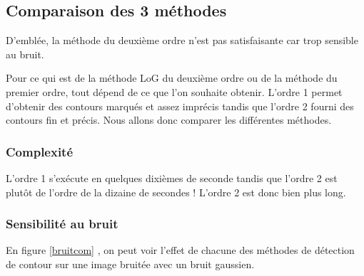 \documentclass[paper=a4, fontsize=11pt]{scrartcl} %
\begin{document}
\subsection{Comparaison des 3 méthodes}
D'emblée, la méthode du deuxième ordre n'est pas satisfaisante car trop sensible au bruit.

Pour ce qui est de la méthode LoG du deuxième ordre ou de la méthode du premier ordre, tout dépend de ce que l'on souhaite obtenir. L'ordre 1 permet d'obtenir des contours marqués et assez imprécis tandis que l'ordre 2 fourni des contours fin et précis. Nous allons donc comparer les différentes méthodes.
\subsubsection{Complexité}
L'ordre 1 s'exécute en quelques dixièmes de seconde tandis que l'ordre 2 est plutôt de l'ordre de la dizaine de secondes ! L'ordre 2 est donc bien plus long.

\subsubsection{Sensibilité au bruit}
En figure \ref{bruitcom} , on peut voir l'effet de chacune des méthodes de détection de contour sur une image bruitée avec un bruit gaussien.
\end{document}
